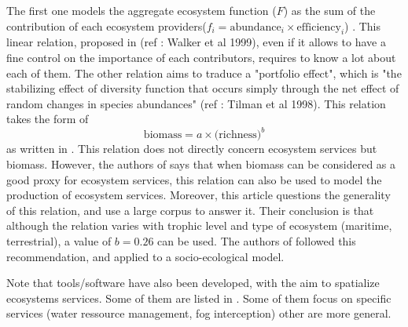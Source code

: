 \documentclass{article}
\begin{document}
\medskip
The first one models the aggregate ecosystem function ($F$) as the sum of the contribution of each ecosystem providers($f_i = \text{abundance}_i \times \text{efficiency}_i$) . This linear relation, proposed in (ref : Walker et al 1999), even if it allows to have a fine control on the importance of each contributors, requires to know a lot about each of them.
The other relation aims to traduce a "portfolio effect", which is "the stabilizing effect of diversity function that occurs simply through the net effect of random changes in species abundances" (ref : Tilman et al 1998). This relation takes the form of $$\text{biomass} = a \times \text{(richness)} ^b$$ as written in \cite{oconnor_general_2017}. This relation does not directly concern ecosystem services but biomass. However, the authors of \cite{oconnor_general_2017} says that when biomass can be considered as a good proxy for ecosystem services, this relation can also be used to model the production of ecosystem services.
Moreover, this article questions the generality of this relation, and use a large corpus to answer it. Their conclusion is that although the relation varies with trophic level and type of ecosystem (maritime, terrestrial), a value of $b = 0.26$ can be used. The authors of \cite{lafuite_time-delayed_2017} followed this recommendation, and applied to a socio-ecological model.

\medskip
Note that tools/software have also been developed, with the aim to spatialize ecosystems services. Some of them are listed in \cite{ochoa_tools_2017}. Some of them focus on specific services (water ressource management, fog interception) other are more general.



\end{document}
